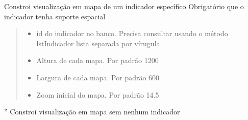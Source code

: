 \documentclass[letterpaper,10pt,brazil]{sphinxmanual}
\begin{document}
\begin{fulllineitems}
\begin{fulllineitems}
\label{\detokenize{api_gen/apiModulo.api_visualizacao:apiModulo.api_visualizacao.ApiVis.visMapaIndicador}}
\pysigstartsignatures
{}
\pysigstopsignatures
\sphinxAtStartPar
Constroi visualização em mapa de um indicador específico
Obrigatório que o indicador tenha suporte espacial
\begin{quote}\begin{description}
\begin{itemize}
\item {} 
\sphinxAtStartPar
{} \textendash{} id do indicador no banco. Precisa consultar usando o método lstIndicador \sphinxhyphen{} lista separada por vírugula

\item {} 
\sphinxAtStartPar
{} \textendash{} Altura de cada mapa. Por padrão 1200

\item {} 
\sphinxAtStartPar
{} \textendash{} Largura de cada mapa. Por padrão 600

\item {} 
\sphinxAtStartPar
{} \textendash{} Zoom inicial do mapa. Por padrão 14.5

\end{itemize}

\end{description}\end{quote}

\end{fulllineitems}


\begin{fulllineitems}
\label{\detokenize{api_gen/apiModulo.api_visualizacao:apiModulo.api_visualizacao.ApiVis.visMapaSemIndicador}}
\pysigstartsignatures
{}
\pysigstopsignatures
\sphinxAtStartPar
”
Constroi visualização em mapa sem nenhum indicador


\end{fulllineitems}
\end{fulllineitems}
\end{document}
